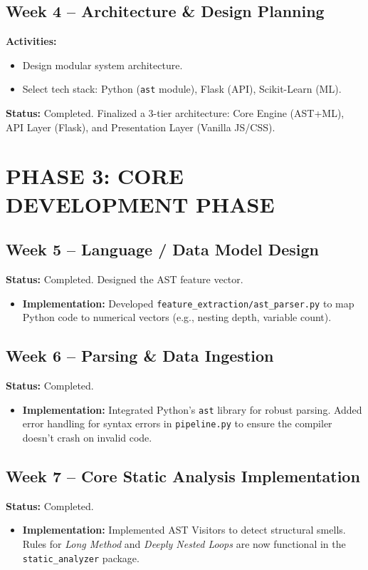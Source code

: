\documentclass[12pt,a4paper]{article}
\begin{document}
\subsection{Week 4 -- Architecture \& Design Planning}
\textbf{Activities:}
\begin{itemize}[noitemsep]
    \item Design modular system architecture.
    \item Select tech stack: Python (\texttt{ast} module), Flask (API), Scikit-Learn (ML).
\end{itemize}
\textbf{Status:} \textcolor{statuscolor}{Completed}. Finalized a 3-tier architecture: Core Engine (AST+ML), API Layer (Flask), and Presentation Layer (Vanilla JS/CSS).

\section{PHASE 3: CORE DEVELOPMENT PHASE}

\subsection{Week 5 -- Language / Data Model Design}
\textbf{Status:} \textcolor{statuscolor}{Completed}. Designed the AST feature vector.
\begin{itemize}
    \item \textbf{Implementation:} Developed \texttt{feature\_extraction/ast\_parser.py} to map Python code to numerical vectors (e.g., nesting depth, variable count).
\end{itemize}

\subsection{Week 6 -- Parsing \& Data Ingestion}
\textbf{Status:} \textcolor{statuscolor}{Completed}. 
\begin{itemize}
    \item \textbf{Implementation:} Integrated Python's \texttt{ast} library for robust parsing. Added error handling for syntax errors in \texttt{pipeline.py} to ensure the compiler doesn't crash on invalid code.
\end{itemize}

\subsection{Week 7 -- Core Static Analysis Implementation}
\textbf{Status:} \textcolor{statuscolor}{Completed}. 
\begin{itemize}
    \item \textbf{Implementation:} Implemented AST Visitors to detect structural smells. Rules for \textit{Long Method} and \textit{Deeply Nested Loops} are now functional in the \texttt{static\_analyzer} package.
\end{itemize}
\end{document}
